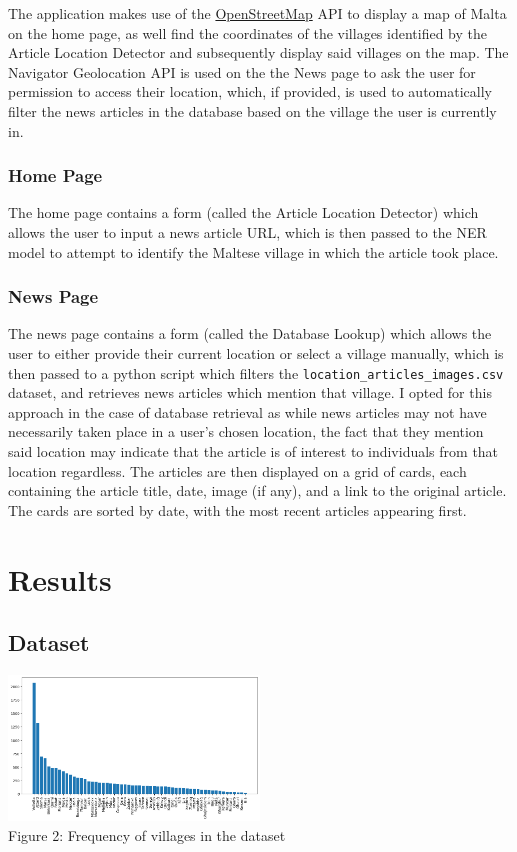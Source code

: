 \documentclass[a4paper, oneside, 11pt]{article}
\begin{document}
\begin{multicols*}{2}
  The application makes use of the \href{https://www.openstreetmap.org/}{OpenStreetMap} API to display a map of Malta on the home page, as well find the coordinates of the villages identified by the Article Location Detector and subsequently display said villages on the map. The Navigator Geolocation API is used on the the News page to ask the user for permission to access their location, which, if provided, is used to automatically filter the news articles in the database based on the village the user is currently in.

  \subsubsection{Home Page}
  The home page contains a form (called the Article Location Detector) which allows the user to input a news article URL, which is then passed to the NER model to attempt to identify the Maltese village in which the article took place.

  \subsubsection{News Page}
  The news page contains a form (called the Database Lookup) which allows the user to either provide their current location or select a village manually, which is then passed to a python script which filters the \verb|location_articles_images.csv| dataset, and retrieves news articles which mention that village. I opted for this approach in the case of database retrieval as while news articles may not have necessarily taken place in a user's chosen location, the fact that they mention said location may indicate that the article is of interest to individuals from that location regardless. The articles are then displayed on a grid of cards, each containing the article title, date, image (if any), and a link to the original article. The cards are sorted by date, with the most recent articles appearing first.


  \section{Results}
  \subsection{Dataset}
  \begin{center}
    \includegraphics[width=0.5\textwidth]{./figures/villagefreq.png} \\
    Figure 2: Frequency of villages in the dataset
  \end{center}


\end{multicols*}
\end{document}
